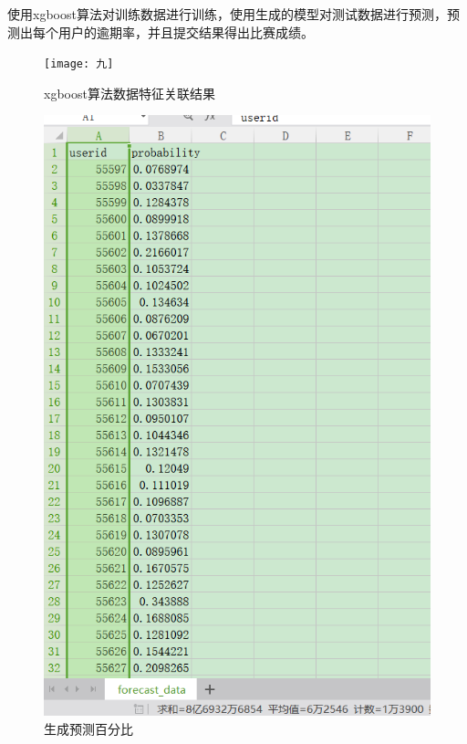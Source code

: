 \documentclass{article}
\begin{document}
使用xgboost算法对训练数据进行训练，使用生成的模型对测试数据进行预测，预测出每个用户的逾期率，并且提交结果得出比赛成绩。

\begin{figure}[h]
\centering
\texttt{[image: 九]}
\caption{xgboost算法数据特征关联结果}

\includegraphics[scale=0.3]{十}
\caption{生成预测百分比}


\end{figure}
\end{document}
